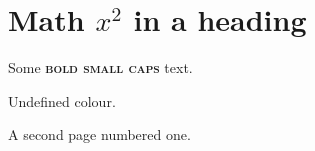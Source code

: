 \documentclass{article}
\begin{document}
\section{Math $x^2$ in a heading}
Some \textsc{\textbf{bold small caps}} text.

\localfail

{\color{nocolor} Undefined colour.}

\newpage
\setcounter{page}{1}
A second page numbered one.
\end{document}
